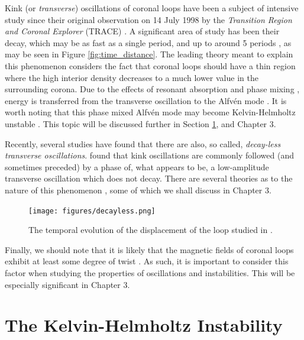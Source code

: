 Kink (or \emph{transverse}) oscillations of coronal loops have been a subject of intensive study since their original observation on 14 July 1998 by the \textit{Transition Region and Coronal Explorer} (TRACE) \citep{Aschwanden1999, Nakariakov1999}.
A significant area of study has been their decay, which may be as fast as a single period, and up to around 5 periods \citep{Goddard2016}, as may be seen in Figure \ref{fig:time_distance}.
The leading theory meant to explain this phenomenon considers the fact that coronal loops should have a thin region where the high interior density decreases to a much lower value in the surrounding corona.
Due to the effects of resonant absorption \citep{Hollweg1988, Sakurai1991, Goossens2011} and phase mixing \citep{Heyvaerts1983}, energy is transferred from the transverse oscillation to the Alfv\'en mode \citep{Ruderman2002}.
It is worth noting that this phase mixed Alfv\'en mode may become Kelvin-Helmholtz unstable \citep{Browning1984}.
This topic will be discussed further in Section \ref{sec:KHI}, and Chapter 3.

Recently, several studies have found that there are also, so called, \emph{decay-less transverse oscillations}.
\cite{Nistico2013, Anfinogentov2013, Anfinogentov2015} found that kink oscillations are commonly
followed (and sometimes preceded) by a phase of, what appears to be, a low-amplitude transverse oscillation which does not decay.
There are several theories as to the nature of this phenomenon \citep{Hindman2014, Antolin2016, Duckenfield2018}, some of which we shall discuss in Chapter 3.

\begin{figure}[t]
\centering
\texttt{[image: figures/decayless.png]}
\caption{The temporal evolution of the displacement of the loop studied in \cite{Nistico2013}.
}
\label{fig:decayless}
\end{figure}

Finally, we should note that it is likely that the magnetic fields of coronal loops exhibit at least some degree of twist \citep{Klimchuk2000, Malanushenko2009, Malanushenko2011}.
As such, it is important to consider this factor when studying the properties of oscillations and instabilities.
This will be especially significant in Chapter 3.

\section{The Kelvin-Helmholtz Instability}
\label{sec:KHI}

